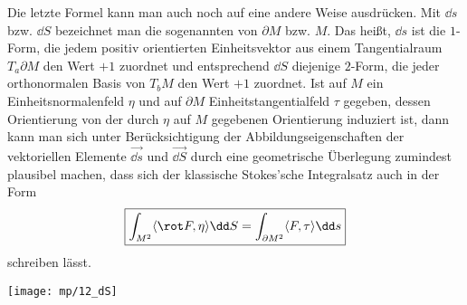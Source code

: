 \begin{antwort}
  Die letzte Formel kann man auch noch auf eine andere Weise ausdrücken.  
  Mit $\dd s$ bzw. $\dd S$ bezeichnet man die sogenannten   
   von $\partial M$ bzw. 
  $M$. Das heißt, $\dd s$ ist die $1$-Form, die jedem positiv 
  orientierten Einheitsvektor aus einem Tangentialraum 
  $T_a \partial M$ den Wert $+1$ zuordnet und entsprechend $\dd S$ diejenige  
  $2$-Form, die jeder orthonormalen Basis von $T_b M$ den Wert $+1$ zuordnet. 
  Ist auf $M$ ein Einheitsnormalenfeld $\eta$ 
  und auf $\partial M$ Einheitstangentialfeld $\tau$ gegeben, 
  dessen Orientierung von der durch $\eta$ auf $M$ gegebenen Orientierung 
  induziert ist, dann kann man sich unter Berücksichtigung der 
  Abbildungseigenschaften der vektoriellen Elemente $\overrightarrow{ \dd s }$ 
  und 
  $\overrightarrow{ \dd S }$ durch eine geometrische Überlegung zumindest 
  plausibel machen, dass sich der klassische Stokes'sche Integralsatz 
  auch in der 
  Form      
  \[
  \boxed{
    \int_{M^2} \langle \rot F, \eta \rangle \dd S = 
    \int_{\partial M^2} \langle F, \tau \rangle \dd s} 
  \]
  schreiben lässt. \AntEnd
  
  \begin{center}
    \texttt{[image: mp/12\_dS]}
    \label{fig:12_stokes}
  \end{center}
\end{antwort} 





